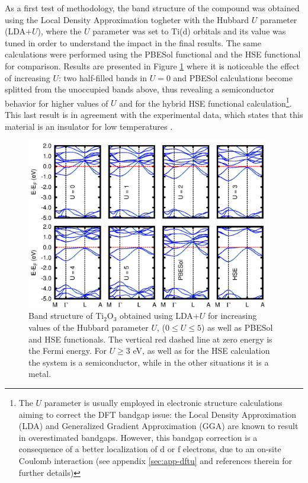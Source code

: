 As a first test of methodology, the band structure of the compound was obtained using the Local Density Approximation togheter with the Hubbard $U$ parameter (LDA$+U$), where the $U$ parameter was set to Ti(d) orbitals and its value was tuned in order to understand the impact in the final results. The same calculations were performed using the PBESol functional and the HSE functional for comparison. Results are presented in Figure \ref{fig:bands-ti2o3} where it is noticeable the effect of increasing $U$: two half-filled bands in $U = 0$ and PBESol calculations become splitted from the unoccupied bands above, thus revealing a semiconductor behavior for higher values of $U$ and for the hybrid HSE functional calculation\footnote{The $U$ parameter is usually employed in electronic structure calculations aiming to correct the DFT bandgap issue: the Local Density Approximation (LDA) and Generalized Gradient Approximation (GGA) are known to result in overestimated bandgaps. However, this bandgap correction is a consequence of a better localization of d or f electrons, due to an on-site Coulomb interaction (see appendix \ref{sec:app-dftu} and references therein for further details)}. This last result is in agreement with the experimental data, which states that this material is an insulator for low temperatures \cite{Uchida2008,Guo2012}.
\begin{figure}[!ht]
 \centering
  \includegraphics[width=0.95\textwidth]{img/ti2o3-bands.jpg}
  \caption{Band structure of Ti$_2$O$_3$ obtained using LDA+$U$ for increasing values of the Hubbard parameter $U$, ($0 \leq U \leq 5$) as well as PBESol and HSE functionals. The vertical red dashed line at zero energy is the Fermi energy. For $U \geq 3$ eV, as well as for the HSE calculation the system is a semiconductor, while in the other situations it is a metal.} 
  \label{fig:bands-ti2o3}
\end{figure}

